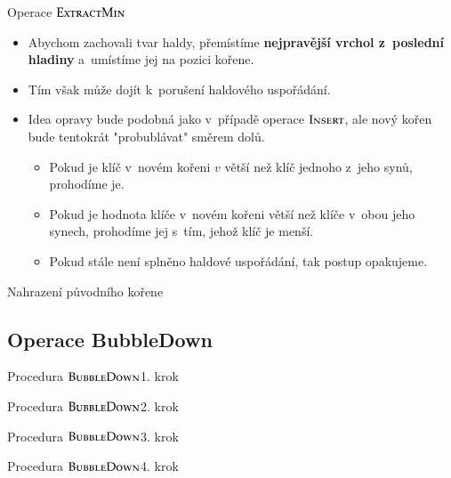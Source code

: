 \documentclass[11pt,professionalfont,aspectratio=43]{beamer}
\begin{document}
    \begin{frame}{Operace $\textsc{ExtractMin}$}
        \begin{itemize}
            \item Abychom zachovali tvar haldy, přemístíme \textbf{nejpravější vrchol z~poslední hladiny} a~umístíme jej na pozici kořene.
            \item Tím však může dojít k~porušení haldového uspořádání.
            \item Idea opravy bude podobná jako v~případě operace $\textsc{Insert}$, ale nový kořen bude tentokrát "probublávat" směrem dolů.
            \begin{itemize}
                \item Pokud je klíč v~novém kořeni $v$ větší než klíč jednoho z~jeho synů, prohodíme je.
                \item Pokud je hodnota klíče v~novém kořeni větší než klíče v~obou jeho synech, prohodíme jej s~tím, jehož klíč je menší.
                \item Pokud stále není splněno haldové uspořádání, tak postup opakujeme.
            \end{itemize}
        \end{itemize}
    \end{frame}

    \begin{frame}{Nahrazení původního kořene}
    \end{frame}

    \subsection{Operace BubbleDown}

    \begin{frame}{Procedura $\textsc{BubbleDown}$}{1. krok}
        \centering
    \end{frame}

    \begin{frame}{Procedura $\textsc{BubbleDown}$}{2. krok}
        \centering
    \end{frame}

    \begin{frame}{Procedura $\textsc{BubbleDown}$}{3. krok}
        \centering
    \end{frame}

    \begin{frame}{Procedura $\textsc{BubbleDown}$}{4. krok}
        \centering
    \end{frame}
\end{document}

